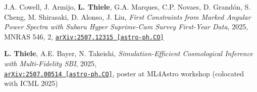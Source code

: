 \begin{minipage}{\textwidth}
J.A. Cowell, J. Armijo, {\bf L. Thiele}, G.A. Marques, C.P. Novaes, D. Grand\'on, S. Cheng, M. Shirasaki, D. Alonso, J. Liu,
\emph{First Constraints from Marked Angular Power Spectra with Subaru Hyper Suprime-Cam Survey First-Year Data}, 2025,\\
MNRAS 546, 2,
\href{https://arxiv.org/abs/2507.12315}{\mbox{\texttt{arXiv:2507.12315 [astro-ph.CO]}}}
\end{minipage}

\begin{minipage}{\textwidth}
{\bf L. Thiele}, A.E. Bayer, N. Takeishi,
\emph{Simulation-Efficient Cosmological Inference with Multi-Fidelity SBI}, 2025,\\
\href{https://arxiv.org/abs/2507.00514}{\mbox{\texttt{arXiv:2507.00514 [astro-ph.CO]}}},
poster at ML4Astro workshop (colocated with ICML 2025)
\end{minipage}


